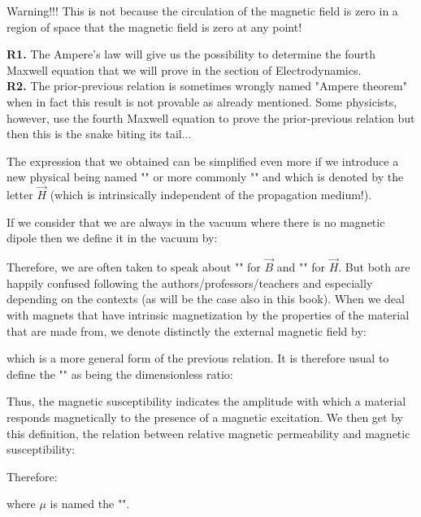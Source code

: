 	Warning!!! This is not because the circulation of the magnetic field is zero in a region of space that the magnetic field is zero at any point!
	\begin{tcolorbox}[title=Remarks,colframe=black,arc=10pt]
	\textbf{R1.} The Ampere's law will give us the possibility to determine the fourth Maxwell equation that we will prove in the section of Electrodynamics.\\
	
	\textbf{R2.} The prior-previous relation is sometimes wrongly named "Ampere theorem" when in fact this result is not provable as already mentioned. Some physicists, however, use the fourth Maxwell equation to prove the prior-previous relation but then this is the snake biting its tail...
	\end{tcolorbox}
	The expression that we obtained can be simplified even more if we introduce a new physical being named "" or more commonly "" and which is denoted by the letter $\vec{H}$ (which is intrinsically independent of the propagation medium!).
	
	If we consider that we are always in the vacuum where there is no magnetic dipole then we define it in the vacuum by:
	
	Therefore, we are often taken to speak about "" for $\vec{B}$ and "" for $\vec{H}$. But both are happily confused following the authors/professors/teachers and especially depending on the contexts (as will be the case also in this book). When we deal with magnets that have intrinsic magnetization by the properties of the material that are made from, we denote distinctly the external magnetic field by:
	
	which is a more general form of the previous relation. It is therefore usual to define the "" as being the dimensionless ratio:
	
	Thus, the magnetic susceptibility indicates the amplitude with which a material responds magnetically to the presence of a magnetic excitation. We then get by this definition, the relation between relative magnetic permeability and magnetic susceptibility:
	
	Therefore:
	
	where $\mu$ is named the "".
	
